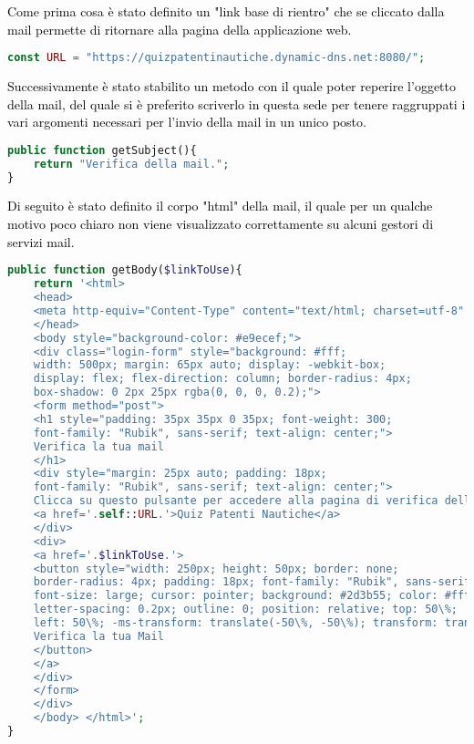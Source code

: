 \textcolor{black}{Come prima cosa è stato definito un "link base di rientro" che se cliccato dalla mail permette di ritornare alla pagina della applicazione web.}\\

 \begin{lstlisting}[language=php]
	const URL = "https://quizpatentinautiche.dynamic-dns.net:8080/";
 \end{lstlisting}
 
  \textcolor{black}{Successivamente è stato stabilito un metodo con il quale poter reperire l'oggetto della mail, del quale si è preferito scriverlo in questa sede per tenere raggruppati i vari argomenti necessari per l'invio della mail in un unico posto.}\\
 
\begin{lstlisting}[language=php]
public function getSubject(){
	return "Verifica della mail.";
}
\end{lstlisting}

\textcolor{black}{Di seguito è stato definito il corpo "html" della mail, il quale per un qualche motivo poco chiaro non viene visualizzato correttamente su alcuni gestori di servizi mail. }\\

\begin{lstlisting}[language=php]
public function getBody($linkToUse){
	return '<html>
	<head>
	<meta http-equiv="Content-Type" content="text/html; charset=utf-8" />
	</head>
	<body style="background-color: #e9ecef;">
	<div class="login-form" style="background: #fff;
	width: 500px; margin: 65px auto; display: -webkit-box;
	display: flex; flex-direction: column; border-radius: 4px;
	box-shadow: 0 2px 25px rgba(0, 0, 0, 0.2);">
	<form method="post">
	<h1 style="padding: 35px 35px 0 35px; font-weight: 300;
	font-family: "Rubik", sans-serif; text-align: center;">
	Verifica la tua mail
	</h1>
	<div style="margin: 25px auto; padding: 18px;
	font-family: "Rubik", sans-serif; text-align: center;">
	Clicca su questo pulsante per accedere alla pagina di verifica della mail inserita su:
	<a href='.self::URL.'>Quiz Patenti Nautiche</a>
	</div>
	<div>
	<a href='.$linkToUse.'>
	<button style="width: 250px; height: 50px; border: none;
	border-radius: 4px; padding: 18px; font-family: "Rubik", sans-serif;
	font-size: large; cursor: pointer; background: #2d3b55; color: #fff;
	letter-spacing: 0.2px; outline: 0; position: relative; top: 50\%;
	left: 50\%; -ms-transform: translate(-50\%, -50\%); transform: translate(-50\%, -50\%);">
	Verifica la tua Mail
	</button>
	</a>
	</div>
	</form>
	</div>
	</body>	</html>';
}
 \end{lstlisting}
 
